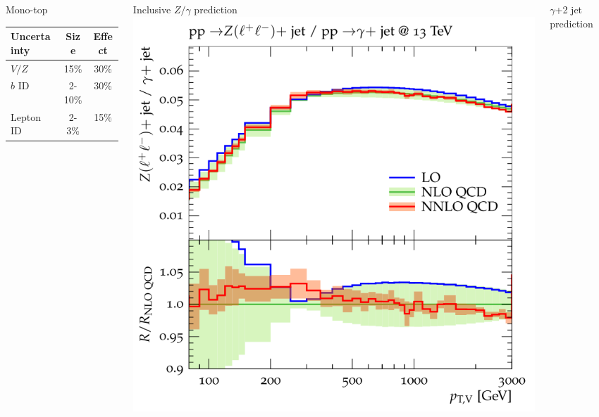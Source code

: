 \documentclass[aspectratio=169,xcolor=dvipsnames,,table,compress]{beamer}
\begin{document}
\begin{frame}
\begin{columns}[T]
\begin{column}{0.33\textwidth}
      \vspace{5mm}
      Mono-top \\
      \begin{tabular}{l|c|c}
        Uncertainty & Size & Effect \\
        \hline \hline
        $V/Z$ & 15\% & 30\%\\
        \hline
        $b$ ID & 2-10\% & 30\% \\
        Lepton ID & 2-3\% & 15\% \\
      \end{tabular}
    \end{column}
    \pause 
    \begin{column}{0.33\textwidth}
      \centering
      Inclusive $Z/\gamma$ prediction \\
      \includegraphics[width=\textwidth]{../figures/talk/mj_theory.png}\\
    \end{column}
    \begin{column}{0.33\textwidth}
      \centering
      $\gamma$+2 jet prediction \\

\end{column}
\end{columns}
\end{frame}
\end{document}

